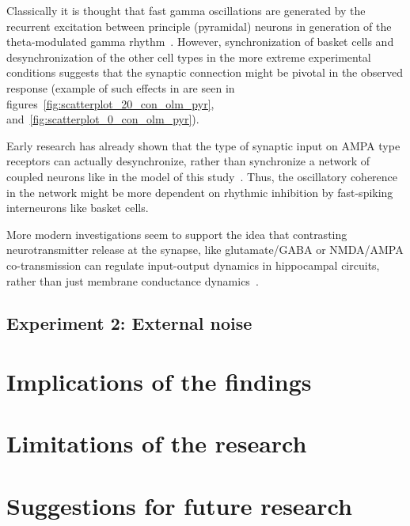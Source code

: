Classically it is thought that fast gamma oscillations are generated by the recurrent excitation between principle (pyramidal) neurons in 
generation of the theta-modulated gamma rhythm~\parencite{wangGammaOscillationSynaptic1996}. However, synchronization of basket cells and 
desynchronization of the other cell types in the more extreme experimental conditions suggests that the synaptic connection might be pivotal 
in the observed response (example of such effects in are seen in figures~\ref{fig:scatterplot_20_con_olm_pyr}, and~\ref{fig:scatterplot_0_con_olm_pyr}).

Early research has already shown that the type of synaptic input on AMPA type receptors can actually desynchronize, rather than synchronize
a network of coupled neurons like in the model of this study~\parencite{vanvreeswijkWhenInhibitionNot1994,khazipovSynchronizationGABAergicInterneuronal1997}. 
Thus, the oscillatory coherence in the network might be more dependent on rhythmic inhibition by fast-spiking interneurons like basket cells. 

More modern investigations seem to support the idea that contrasting neurotransmitter release at the synapse, like glutamate/GABA or NMDA/AMPA co-transmission 
can regulate input-output dynamics in hippocampal circuits, rather than just membrane 
conductance dynamics~\parencite{ajibolaHypothalamicGlutamateGABA2021,micheliMechanisticModelNMDA2021}.

\subsection{Experiment 2: External noise}


\section{Implications of the findings}

\section{Limitations of the research}

\section{Suggestions for future research}